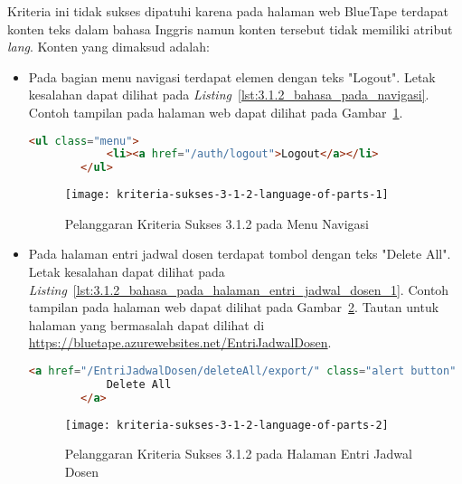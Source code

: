 Kriteria ini tidak sukses dipatuhi karena pada halaman web BlueTape terdapat konten teks dalam bahasa Inggris namun konten tersebut tidak memiliki atribut \textit{lang}. Konten yang dimaksud adalah:

\begin{itemize}
    \item Pada bagian menu navigasi terdapat elemen dengan teks "Logout". Letak kesalahan dapat dilihat pada \mbox{\textit{Listing} \ref{lst:3.1.2_bahasa_pada_navigasi}}. Contoh tampilan pada halaman web dapat dilihat pada \mbox{Gambar \ref{fig:3.1.2_language_of_parts_1}}. 
    \begin{lstlisting}[frame=single, label={lst:3.1.2_bahasa_pada_navigasi}, language=HTML, caption=Pelanggaran Kriteria Sukses 3.1.2 pada Menu Navigasi]
        <ul class="menu">
            <li><a href="/auth/logout">Logout</a></li>
        </ul>
    \end{lstlisting}
    
    \begin{figure}[H]
        \centering  
        \texttt{[image: kriteria-sukses-3-1-2-language-of-parts-1]}  
        \caption[Pelanggaran Kriteria Sukses 3.1.2 pada Menu Navigasi]{Pelanggaran Kriteria Sukses 3.1.2 pada Menu Navigasi}
        \label{fig:3.1.2_language_of_parts_1}  
    \end{figure}

    \item Pada halaman entri jadwal dosen terdapat tombol dengan teks "Delete All". Letak kesalahan dapat dilihat pada \mbox{\textit{Listing} \ref{lst:3.1.2_bahasa_pada_halaman_entri_jadwal_dosen_1}}. Contoh tampilan pada halaman web dapat dilihat pada \mbox{Gambar \ref{fig:3.1.2_language_of_parts_2}}. Tautan untuk halaman yang bermasalah dapat dilihat di \url{https://bluetape.azurewebsites.net/EntriJadwalDosen}.
    \begin{lstlisting}[frame=single, label={lst:3.1.2_bahasa_pada_halaman_entri_jadwal_dosen_1}, language=HTML, caption=Pelanggaran Kriteria Sukses 3.1.2 pada Halaman Entri Jadwal Dosen]
        <a href="/EntriJadwalDosen/deleteAll/export/" class="alert button" onClick="return konfirmasi();">
            Delete All
        </a>
    \end{lstlisting}
    
    \begin{figure}[H]
        \centering  
        \texttt{[image: kriteria-sukses-3-1-2-language-of-parts-2]}  
        \caption[Pelanggaran Kriteria Sukses 3.1.2 pada Halaman Entri Jadwal Dosen]{Pelanggaran Kriteria Sukses 3.1.2 pada Halaman Entri Jadwal Dosen}
        \label{fig:3.1.2_language_of_parts_2}  
    \end{figure}
    

\end{itemize}
